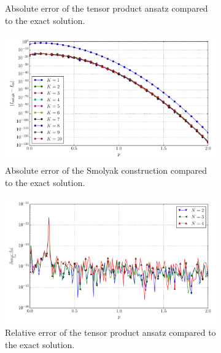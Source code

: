 \documentclass[a4paper,10pt]{article}
\begin{document}
\begin{figure}[ht!]
\begin{subfigure}[t]{0.5\linewidth}
    \caption{Absolute error of the tensor product ansatz compared to the exact solution.}
    \label{fig:tp_sg_6d_conv_p_101000_110000_err_nsd_tp}
  \end{subfigure}
  \begin{subfigure}[t]{0.5\linewidth}
    \includegraphics[width=\linewidth]{./plots/tp_sg_6d_conv_p_(1,0,1,0,0,0)_(1,1,0,0,0,0)_err_nsd_gk.pdf}
    \caption{Absolute error of the Smolyak construction compared to the exact solution.}
    \label{fig:tp_sg_6d_conv_p_101000_110000_err_nsd_gk}
  \end{subfigure}
  \begin{subfigure}[t]{0.5\linewidth}
    \includegraphics[width=\linewidth]{./plots/tp_sg_6d_conv_p_(1,0,1,0,0,0)_(1,1,0,0,0,0)_err_rel_nsd_tp.pdf}
    \caption{Relative error of the tensor product ansatz compared to the exact solution.}
    \label{fig:tp_sg_6d_conv_p_101000_110000_err_rel_nsd_tp}
  \end{subfigure}
  \begin{subfigure}[t]{0.5\linewidth}

\end{subfigure}
\end{figure}
\end{document}
